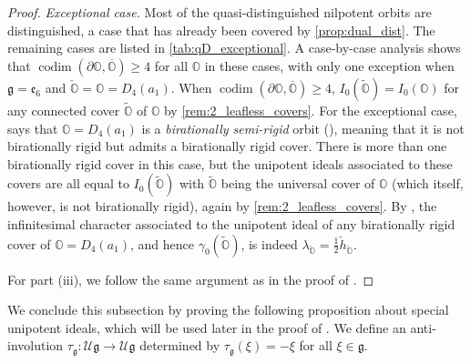 \documentclass[11pt, a4paper]{amsart}
\newcommand{\J}{\mathcal{J}}
\newcommand{\g}{\mathfrak{g}}
\newcommand{\orb}{\mathbb{O}}
\newcommand{\fg}{\mathfrak{g}}
\newcommand{\ckorb}{\check{\orb}}
\newcommand{\cU}{\mathcal{U}}
\newcommand{\Ug}{\cU\fg}
\DeclareMathOperator{\codim}{codim}
\newtheorem{Cor}[Thm]{Corollary}
\theoremstyle{definition}
\numberwithin{equation}{section}
\begin{document}
\begin{proof}
	\noindent\emph{Exceptional case.}
	Most of the quasi-distinguished nilpotent orbits are distinguished, a case that has already been covered by \cref{prop:dual_dist}. The remaining cases are listed in \cref{tab:qD_exceptional}. A case-by-case analysis shows that $\codim(\partial \orb, \overline{\orb}) \geqslant 4$ for all $\orb$ in these cases, with only one exception when $\g = \mathfrak{e}_6$ and $\ckorb = \orb = D_4(a_1)$. When $\codim(\partial \orb, \overline{\orb}) \geqslant 4$, $I_0(\widetilde{\orb}) = I_0(\orb)$ for any connected cover $\widetilde{\orb}$ of $\orb$ by \cref{rem:2_leafless_covers}.
	For the exceptional case, \cite[Proposition 3.9.5]{MBM} says that $\orb = D_4(a_1)$ is a {\it birationally semi-rigid} orbit (\cite[Definition 3.9.1]{MBM}), meaning that it is not birationally rigid but admits a birationally rigid cover. There is more than one birationally rigid cover in this case, but the unipotent ideals associated to these covers are all equal to $I_0(\widetilde{\orb})$ with $\widetilde{\orb}$ being the universal cover of $\orb$ (which itself, however, is not birationally rigid), again by \cref{rem:2_leafless_covers}. By \cite[Table 11]{MBM}, the infinitesimal character associated to the unipotent ideal of any birationally rigid cover of $\orb = D_4(a_1)$, and hence $\gamma_0(\widetilde{\orb})$, is indeed $\lambda_{\ckorb} = \frac{1}{2}\check{h}_{\ckorb}$.

	For part (iii), we follow the same argument as in the proof of \cite[Proposition 9.2, (iv)]{LMBM}.
\end{proof}

We conclude this subsection by proving the following proposition about special unipotent ideals, which will be used later in the proof of . We define an anti-involution $\tau_\g: \Ug \to \Ug$ determined by $\tau_\g(\xi) = -\xi$ for all $\xi \in \fg$.
\end{document}
